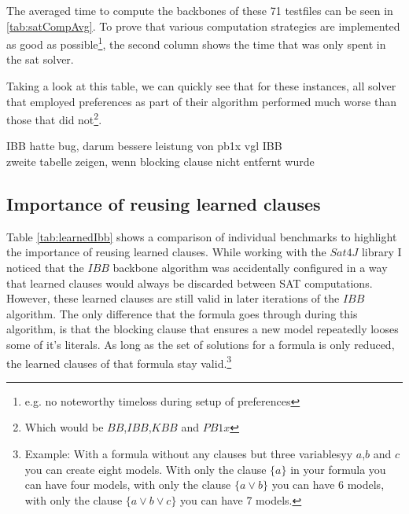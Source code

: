 The averaged time to compute the backbones of these 71 testfiles can be seen in \ref{tab:satCompAvg}. To prove that various computation strategies are implemented as good as possible\footnote{e.g. no noteworthy timeloss during setup of preferences}, the second column shows the time that was only spent in the sat solver.

Taking a look at this table, we can quickly see that for these instances, all solver that employed preferences as part of their algorithm performed much worse than those that did not\footnote{Which would be $BB$,$IBB$,$KBB$ and $PB1x$}.

IBB hatte bug, darum bessere leistung von pb1x vgl IBB\\
zweite tabelle zeigen, wenn blocking clause nicht entfernt wurde

\subsection{Importance of reusing learned clauses}
Table \ref{tab:learnedIbb} shows a comparison of individual benchmarks to highlight the importance of reusing learned clauses. While working with the $Sat4J$ library I noticed that the $IBB$ backbone algorithm was accidentally configured in a way that learned clauses would always be discarded between SAT computations. However, these learned clauses are still valid in later iterations of the $IBB$ algorithm. The only difference that the formula goes through during this algorithm, is that the blocking clause that ensures a new model repeatedly looses some of it's literals. As long as the set of solutions for a formula is only reduced, the learned clauses of that formula stay valid.\footnote{Example: With a formula without any clauses but three variablesyy $a$,$b$ and $c$ you can create eight models. With only the clause $\{a\}$ in your formula you can have four models, with only the clause $\{a \lor b\}$ you can have 6 models, with only the clause $\{a\lor b \lor c\}$ you can have 7 models.}

